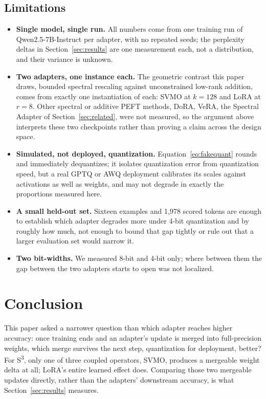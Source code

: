 \documentclass[conference]{IEEEtran}
\begin{document}
\subsection{Limitations}
\label{sec:limitations}

\begin{itemize}[leftmargin=*]
    \item \textbf{Single model, single run.} All numbers come from one training run of Qwen2.5-7B-Instruct per adapter, with no repeated seeds; the perplexity deltas in Section~\ref{sec:results} are one measurement each, not a distribution, and their variance is unknown.
    \item \textbf{Two adapters, one instance each.} The geometric contrast this paper draws, bounded spectral rescaling against unconstrained low-rank addition, comes from exactly one instantiation of each: SVMO at $k=128$ and LoRA at $r=8$. Other spectral or additive PEFT methods, DoRA, VeRA, the Spectral Adapter of Section~\ref{sec:related}, were not measured, so the argument above interprets these two checkpoints rather than proving a claim across the design space.
    \item \textbf{Simulated, not deployed, quantization.} Equation~\ref{eq:fakequant} rounds and immediately dequantizes; it isolates quantization error from quantization speed, but a real GPTQ or AWQ deployment calibrates its scales against activations as well as weights, and may not degrade in exactly the proportions measured here.
    \item \textbf{A small held-out set.} Sixteen examples and 1{,}978 scored tokens are enough to establish which adapter degrades more under 4-bit quantization and by roughly how much, not enough to bound that gap tightly or rule out that a larger evaluation set would narrow it.
    \item \textbf{Two bit-widths.} We measured 8-bit and 4-bit only; where between them the gap between the two adapters starts to open was not localized.
\end{itemize}

\section{Conclusion}
\label{sec:conclusion}

This paper asked a narrower question than which adapter reaches higher accuracy: once training ends and an adapter's update is merged into full-precision weights, which merge survives the next step, quantization for deployment, better? For S\textsuperscript{3}, only one of three coupled operators, SVMO, produces a mergeable weight delta at all; LoRA's entire learned effect does. Comparing those two mergeable updates directly, rather than the adapters' downstream accuracy, is what Section~\ref{sec:results} measures.
\end{document}

